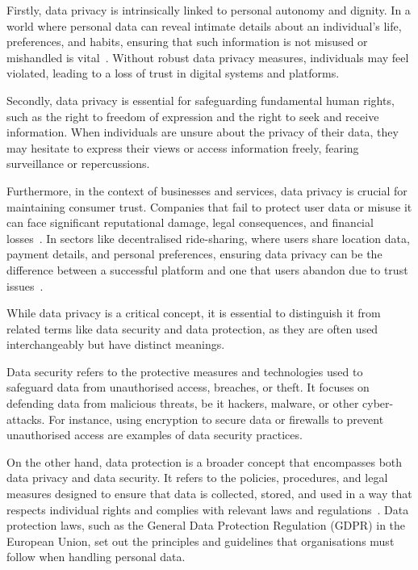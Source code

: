 Firstly, data privacy is intrinsically linked to personal autonomy and dignity. In a world where personal data can reveal intimate details about an individual's life, preferences, and habits, ensuring that such information is not misused or mishandled is vital~\cite{Covert.2020}. Without robust data privacy measures, individuals may feel violated, leading to a loss of trust in digital systems and platforms.

Secondly, data privacy is essential for safeguarding fundamental human rights, such as the right to freedom of expression and the right to seek and receive information. When individuals are unsure about the privacy of their data, they may hesitate to express their views or access information freely, fearing surveillance or repercussions.

Furthermore, in the context of businesses and services, data privacy is crucial for maintaining consumer trust. Companies that fail to protect user data or misuse it can face significant reputational damage, legal consequences, and financial losses~\cite{Li.2019}. In sectors like decentralised ride-sharing, where users share location data, payment details, and personal preferences, ensuring data privacy can be the difference between a successful platform and one that users abandon due to trust issues~\cite{Li.2019}.

While data privacy is a critical concept, it is essential to distinguish it from related terms like data security and data protection, as they are often used interchangeably but have distinct meanings.

Data security refers to the protective measures and technologies used to safeguard data from unauthorised access, breaches, or theft. It focuses on defending data from malicious threats, be it hackers, malware, or other cyber-attacks. For instance, using encryption to secure data or firewalls to prevent unauthorised access are examples of data security practices.

On the other hand, data protection is a broader concept that encompasses both data privacy and data security. It refers to the policies, procedures, and legal measures designed to ensure that data is collected, stored, and used in a way that respects individual rights and complies with relevant laws and regulations~\cite{Covert.2020}. Data protection laws, such as the General Data Protection Regulation (GDPR) in the European Union, set out the principles and guidelines that organisations must follow when handling personal data.

